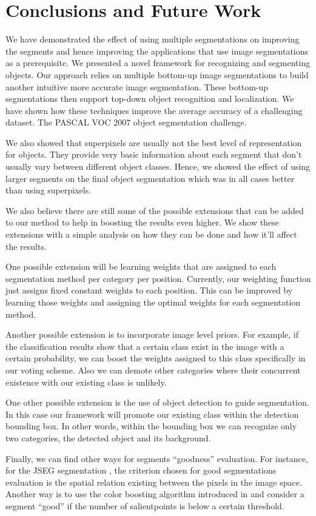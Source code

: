 \documentclass[10pt,twocolumn,letterpaper]{article}
\begin{document}
\section{Conclusions and Future Work}\label{sectionConclusions}

We have demonstrated the effect of using multiple segmentations on improving
the segments and hence improving the applications that use image
segmentations as a prerequisite. We presented a novel framework for recognizing
and segmenting objects. Our approach relies on multiple bottom-up image
segmentations to build another intuitive more accurate image segmentation.
These bottom-up segmentations then support top-down object recognition
and localization. We have shown how these techniques improve the average accuracy
of a challenging dataset. The PASCAL VOC 2007 object segmentation challenge.

We also showed that superpixels are usually not the best level of representation
for objects. They provide very basic information about each segment that don't
usually vary between different object classes. Hence, we showed the effect of
using larger segments on the final object segmentation which was in all cases
better than using superpixels.

We also believe there are still some of the possible extensions that can be added
to our method to help in boosting the results even higher. We show these extensions
with a simple analysis on how they can be done and how it'll affect the results.

One possible extension will be learning weights that are assigned to each segmentation method per category per position.
Currently, our weighting function just assigns fixed constant weights to each position. This can be improved by
learning those weights and assigning the optimal weights for each segmentation method.

Another possible extension is to incorporate image level priors. For example, if the classification
results show that a certain class exist in the image with a certain probability, we can boost the
weights assigned to this class specifically in our voting scheme. Also we can demote other categories
where their concurrent existence with our existing class is unlikely.

One other possible extension is the use of object detection to guide segmentation. In this case our
framework will promote our existing class within the detection bounding box. In other words, within
the bounding box we can recognize only two categories, the detected object and its background.

Finally, we can find other ways for segments ``goodness'' evaluation. For instance, for the JSEG segmentation
\cite{jseg:462311}, the criterion chosen for good segmentations evaluation is the spatial relation existing
between the pixels in the image space. Another way is to use the color boosting algorithm introduced in
\cite{Weijer05boostingcolor} and consider a segment ``good'' if the number of salientpoints is below a certain threshold.

{\small


}
\end{document}
